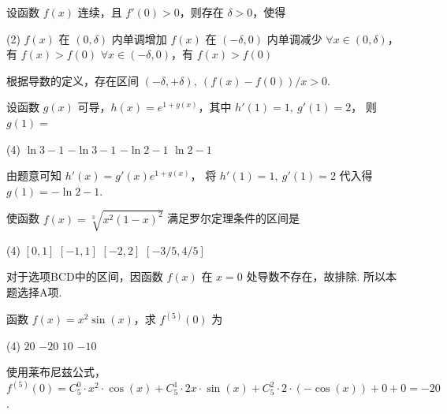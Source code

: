 \begin{problem}
  设函数 $f(x)$ 连续，且 $f'(0) > 0$，则存在 $\delta > 0$，使得
  \begin{tasks}(2)
    \task $f(x)$ 在 $(0,\delta)$ 内单调增加
    \task $f(x)$ 在 $(-\delta,0)$ 内单调减少
    \task[\true] $\forall x \in (0,\delta)$，有 $f(x) > f(0)$
    \task $\forall x \in (-\delta,0)$，有 $f(x) > f(0)$
  \end{tasks}
\end{problem}
\scratch[4ex]
\begin{solution}
  根据导数的定义，存在区间 $(-\delta,+\delta),~ (f(x) - f(0))/x > 0$.
\end{solution}

\begin{problem}
  设函数 $g(x)$ 可导，$h(x) = e^{1 + g(x)}$，其中 $h'(1) = 1,~ g'(1) = 2$，
  则 $g(1) = $
  \begin{tasks}(4)
    \task $\ln 3 - 1$
    \task $-\ln 3 - 1$
    \task[\true] $-\ln 2 - 1$
    \task $\ln 2 - 1$
  \end{tasks}
\end{problem}
\scratch[6ex]
\begin{solution}
  由题意可知 $h'(x) = g'(x) e^{1 + g(x)}$，
  将 $h'(1) = 1,~ g'(1) = 2$ 代入得 $g(1) = -\ln 2 - 1$.
\end{solution}

\begin{problem}
  使函数 $f(x) = \sqrt[3]{x^2(1 - x)^2}$ 满足罗尔定理条件的区间是
  \begin{tasks}(4)
    \task[\true] $[0,1]$
    \task $[-1,1]$
    \task $[-2,2]$
    \task $[-3/5,4/5]$
  \end{tasks}
\end{problem}
\scratch[4ex]
\begin{solution}
  对于选项BCD中的区间，因函数 $f(x)$ 在 $x = 0$ 处导数不存在，故排除. 所以本题选择A项.
\end{solution}

\begin{problem}
  函数 $f(x) = x^2\sin(x)$，求 $f^{(5)}(0)$ 为
  \begin{tasks}(4)
    \task $20$
    \task[\true] $-20$
    \task $10$
    \task $-10$
  \end{tasks}
\end{problem}
\scratch[8ex]
\begin{solution}
  使用莱布尼兹公式，
  $f^{(5)}(0) = C_5^0 \cdot x^2 \cdot \cos(x) + C_5^1 \cdot 2x \cdot \sin(x)
              + C_5^2 \cdot 2 \cdot (-\cos(x)) + 0 + 0 = -20$.
\end{solution}

